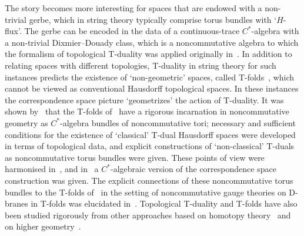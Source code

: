 \documentclass[10pt,a4paper]{amsart}
\numberwithin{equation}{section}
\begin{document}
The story becomes more interesting for spaces that are endowed with a
non-trivial gerbe, which in string theory typically comprise torus
bundles with `$H$-flux'. The gerbe can be encoded in the data of a
continuous-trace $C^*$-algebra with a non-trivial Dixmier--Douady
class, which is a noncommutative algebra to which the formalism of
topological T-duality was applied originally
in~\cite{Bouwknegt2003,Mathai2004,Mathai2005}. In addition to relating
spaces with different topologies, T-duality in string theory for such
instances predicts the existence of `non-geometric' spaces, called T-folds~\cite{Hull2004},
which cannot be viewed as conventional Hausdorff topological
spaces. In these instances the correspondence space picture
`geometrizes' the action of T-duality. It was shown
by~\cite{Bouwknegt2008, Mathai2004,Mathai2005} that the T-folds
of~\cite{Hull2004} have a rigorous incarnation in noncommutative
geometry as $C^*$-algebra bundles of noncommutative tori; necessary
and sufficient conditions for the existence of `classical' T-dual
Hausdorff spaces were developed in terms of topological data, and explicit constructions of `non-classical'
T-duals as noncommutative torus bundles were given. These points of view were harmonised
in~\cite{Brodzki2006}, and in~\cite{Brodzki2007} a $C^*$-algebraic
version of the correspondence space construction was given. The explicit connections of these
noncommutative torus bundles to the T-folds of~\cite{Hull2004} in the
setting of noncommutative gauge theories on D-branes in T-folds
was elucidated
in~\cite{Ellwood2006,Grange2006,Hull2019, Lowe2003}. Topological
T-duality and T-folds have also been studied rigorously from other
approaches based on homotopy
theory~\cite{Bunke2006, Bunke2005} and on higher
geometry~\cite{Nikolaus2018}.
\end{document}
